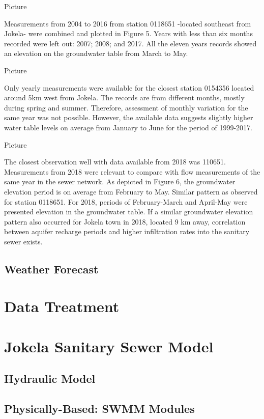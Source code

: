 Picture

Measurements from 2004 to 2016 from station 0118651 -located southeast from Jokela- were combined and plotted in Figure 5. Years with less than six months recorded were left out: 2007; 2008; and 2017. All the eleven years records showed an elevation on the groundwater table from March to May. 

Picture

Only yearly measurements were available for the closest station 0154356 located around 5km west from Jokela. The records are from different months, mostly during spring and summer. Therefore, assessment of monthly variation for the same year was not possible. However, the available data suggests slightly higher water table levels on average from January to June for the period of 1999-2017.

Picture

The closest observation well with data available from 2018 was 110651. Measurements from 2018 were relevant to compare with flow measurements of the same year in the sewer network. As depicted in Figure 6, the groundwater elevation period is on average from February to May. Similar pattern as observed for station 0118651. For 2018, periods of February-March and April-May were presented elevation in the groundwater table. If a similar groundwater elevation pattern also occurred for Jokela town in 2018, located 9 km away, correlation between aquifer recharge periods and higher infiltration rates into the sanitary sewer exists. 
    
    
    \subsection{Weather Forecast}

\section{Data Treatment}

\section{Jokela Sanitary Sewer Model}

    \subsection{Hydraulic Model}
    
    \subsection{Physically-Based: SWMM Modules}
        
